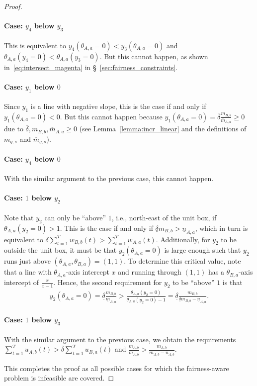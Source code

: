 \documentclass[letterpaper]{article} %
\begin{document}
\begin{proof}
\paragraph{Case: $y_4$ below $y_3$}
This is equivalent to $y_4(\theta_{A,a}=0) < y_3(\theta_{A,a}=0)$ and $\theta_{A,a}(y_4=0) < \theta_{A,a}(y_3=0)$.
%
But this cannot happen, as shown in~\eqref{eq:intersect_magenta} in \S~\ref{sec:fairness_constraints}.

\paragraph{Case: $y_1$ below $0$}
Since $y_1$ is a line with negative slope, this is the case if and only if $y_1(\theta_{A,a}=0) < 0$. But this cannot happen because $y_1(\theta_{A,a}=0) = \overline{\delta} \frac{m_{B,b}}{\overline{m}_{A,a}} \geq 0$ due to $\overline{\delta}, m_{B,b}, \overline{m}_{A,a} \geq 0$ (see Lemma~\ref{lemma:incr_linear} and the definitions of $m_{g,s}$ and $\overline{m}_{g,s}$).

\paragraph{Case: $y_4$ below $0$}
With the similar argument to the previous case, this cannot happen.

\paragraph{Case: $1$ below $y_2$}
Note that $y_2$ can only be ``above'' $1$, i.e., north-east of the unit box, if $\theta_{A,a}(y_2=0) > 1$. This is the case if and only if $\underline{\delta} m_{B,b} > \underline{n}_{A,a}$, which in turn is equivalent to $\underline{\delta} \sum_{t=1}^T w_{B,b}(t) > \sum_{t=1}^T w_{A,a}(t)$.
%
Additionally, for $y_2$ to be outside the unit box, it must be that $y_2(\theta_{A,a}=0)$ is large enough such that $y_2$ runs just above $(\theta_{A,a},\theta_{B,a})=(1,1)$. To determine this critical value, note that a line with $\theta_{A,a}$-axis intercept $x$ and running through $(1,1)$ has a $\theta_{B,a}$-axis intercept of $\frac{x}{x-1}$.
%
Hence, the second requirement for $y_2$ to be ``above'' $1$ is that
\begin{align*}
    y_2(\theta_{A,a}=0) = \underline{\delta} \frac{m_{B,b}}{\underline{m}_{A,a}} > \frac{\theta_{A,a}(y_2=0)}{\theta_{A,a}(y_2=0) - 1} = \underline{\delta} \frac{m_{B,b}}{\underline{\delta} m_{B,b} - \underline{n}_{A,a}}.
\end{align*}

\paragraph{Case: $1$ below $y_3$}
With the similar argument to the previous case, we obtain the requirements $\sum_{t=1}^T u_{A,b}(t) > \overline{\delta} \sum_{t=1}^T u_{B,a}(t)$ and $\frac{m_{A,b}}{\overline{m}_{A,b}} > \frac{m_{A,b}}{m_{A,b} - \overline{n}_{A,b}}$.

This completes the proof as all possible cases for which the fairness-aware problem is infeasible are covered.
\end{proof}
\end{document}
